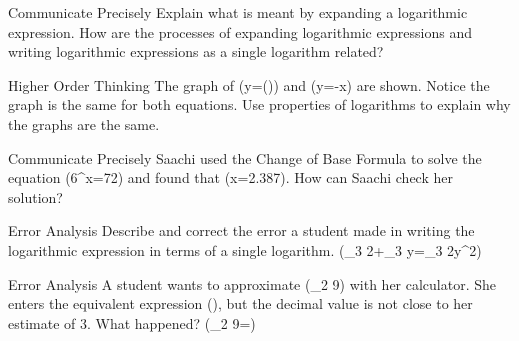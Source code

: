 \documentclass{article}
\newenvironment{practice}[2]{}{}        %
\newcommand{\answer}[1]{}               %
\newcommand{\placeholder}[2]{}          %
\newcommand{\te}[1]{}                   %
\begin{document}
\begin{practice}{8}{2}
Communicate Precisely Explain what is meant by expanding a logarithmic expression. How are the processes of expanding logarithmic expressions and writing logarithmic expressions as a single logarithm related?
\answer{To expand, separate the factors inside the logarithm into separate sums of logarithms. To write a single logarithmic expression, combine sums of logarithms into a single logarithm of the product.}
\end{practice}
\begin{practice}{9}{2}
Higher Order Thinking The graph of (y=\log()) and (y=-\log x) are shown. Notice the graph is the same for both equations. Use properties of logarithms to explain why the graphs are the same.
\placeholder{graph}{Square coordinate grid, x and y axes with arrowheads at both ends, unit spacing and labels -4,-2,2,4; origin O. Window -5 to 5 on both axes. One red decreasing curve represents both y=log(1/x) and y=-log x, approaches vertical asymptote x=0 from the right with upward arrow, crosses (1,0), and continues right with an arrow below the x-axis. No marked points.}
\answer{(y=\log(\frac{1}{x})=\log1-\log x=0-\log x=-\log x)}
\end{practice}
\begin{practice}{10}{2}
Communicate Precisely Saachi used the Change of Base Formula to solve the equation (6^x=72) and found that (x=2.387). How can Saachi check her solution?
\answer{Saachi can check if (6^{2.387}=72).}
\te{Printed equality in check; the rounded exponent gives an approximate equality.}
\end{practice}
\begin{practice}{11}{2}
Error Analysis Describe and correct the error a student made in writing the logarithmic expression in terms of a single logarithm.
(\log_3 2+\log_3 y=\log_3 2y^2)
\te{The student expression is marked with a red X.}
\answer{The student used 2 as an exponent instead of (\frac{1}{2}). The correct expression is (\log_3 2y^{\frac{1}{2}}).}
\end{practice}
\begin{practice}{12}{2}
Error Analysis A student wants to approximate (\log_2 9) with her calculator. She enters the equivalent expression (), but the decimal value is not close to her estimate of 3. What happened?
(\log_2 9=)
\te{The student expression is marked with a red X.}
\answer{The student applied the change of base property incorrectly.}
\end{practice}
\end{document}

